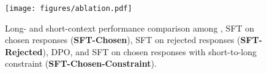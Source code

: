 



\begin{figure}[!t]
\centering
\texttt{[image: figures/ablation.pdf]}
\caption{Long- and short-context performance comparison among \ourMethod{}, SFT on chosen responses (\textbf{SFT-Chosen}), SFT on rejected responses (\textbf{SFT-Rejected}), DPO, and SFT on chosen responses with short-to-long constraint (\textbf{SFT-Chosen-Constraint}). }
\vspace{-0.7em}
\label{fig:ablation}
\end{figure}















